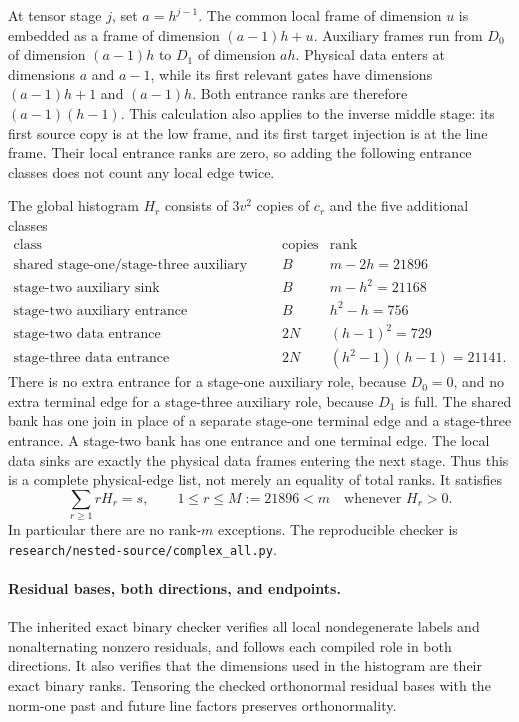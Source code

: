 At tensor stage $j$, set $a=h^{j-1}$. The common local frame of dimension
$u$ is embedded as a frame of dimension $(a-1)h+u$. Auxiliary frames run
from $D_0$ of dimension $(a-1)h$ to $D_1$ of dimension $ah$. Physical data
enters at dimensions $a$ and $a-1$, while its first relevant gates have
dimensions $(a-1)h+1$ and $(a-1)h$. Both entrance ranks are therefore
$(a-1)(h-1)$. This calculation also applies to the inverse middle stage:
its first source copy is at the low frame, and its first target injection
is at the line frame. Their local entrance ranks are zero, so adding the
following entrance classes does not count any local edge twice.

The global histogram $H_r$ consists of $3v^2$ copies of $c_r$ and the five
additional classes
\[
\begin{array}{l|r|r}
 \text{class}&\text{copies}&\text{rank}\\\hline
 \text{shared stage-one/stage-three auxiliary join}&B&m-2h=21896\\
 \text{stage-two auxiliary sink}&B&m-h^2=21168\\
 \text{stage-two auxiliary entrance}&B&h^2-h=756\\
 \text{stage-two data entrance}&2N&(h-1)^2=729\\
 \text{stage-three data entrance}&2N&(h^2-1)(h-1)=21141.
\end{array}
\]
There is no extra entrance for a stage-one auxiliary role, because $D_0=0$,
and no extra terminal edge for a stage-three auxiliary role, because
$D_1$ is full. The shared bank has one join in place of a separate
stage-one terminal edge and a stage-three entrance. A stage-two bank has
one entrance and one terminal edge. The local data sinks are exactly the
physical data frames entering the next stage. Thus this is a complete
physical-edge list, not merely an equality of total ranks. It satisfies
\[
 \sum_{r\ge1}rH_r=s,
 \qquad 1\le r\le M:=21896<m\quad\text{whenever }H_r>0.
\]
In particular there are no rank-$m$ exceptions.
The reproducible checker is
\texttt{research/nested-source/complex\_all.py}.

\paragraph{Residual bases, both directions, and endpoints.}
The inherited exact binary checker verifies all local nondegenerate labels
and nonalternating nonzero residuals, and follows each compiled role in
both directions. It also verifies that the dimensions used in the histogram
are their exact binary ranks. Tensoring the checked orthonormal residual
bases with the norm-one past and future line factors preserves
orthonormality.

